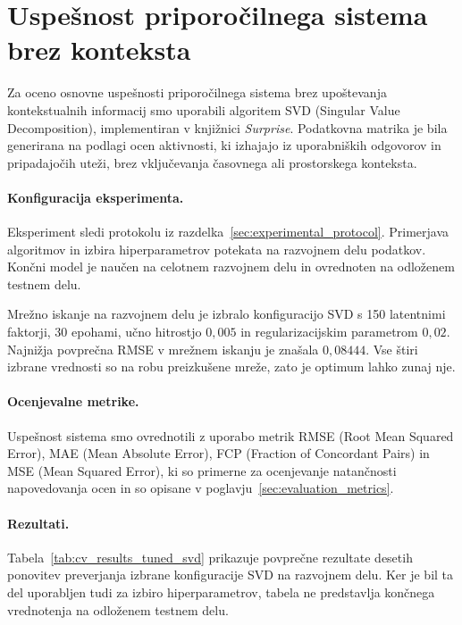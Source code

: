 \documentclass[a4paper,twoside,openright,12pt,slovene]{book}
\begin{document}
\section{Uspešnost priporočilnega sistema brez konteksta} \label{sec:results_without_context}
Za oceno osnovne uspešnosti priporočilnega sistema brez upoštevanja kontekstualnih informacij smo uporabili algoritem SVD (Singular Value Decomposition), implementiran v knjižnici \textit{Surprise}. Podatkovna matrika je bila generirana na podlagi ocen aktivnosti, ki izhajajo iz uporabniških odgovorov in pripadajočih uteži, brez vključevanja časovnega ali prostorskega konteksta.


\paragraph{Konfiguracija eksperimenta.}
Eksperiment sledi protokolu iz
razdelka~\ref{sec:experimental_protocol}. Primerjava algoritmov
in izbira hiperparametrov potekata na razvojnem delu podatkov.
Končni model je naučen na celotnem razvojnem delu in ovrednoten
na odloženem testnem delu.



Mrežno iskanje na razvojnem delu je izbralo konfiguracijo SVD
s 150 latentnimi faktorji, 30 epohami, učno hitrostjo
$0{,}005$ in regularizacijskim parametrom $0{,}02$.
Najnižja povprečna RMSE v mrežnem iskanju je znašala
$0{,}08444$. Vse štiri izbrane vrednosti so na robu preizkušene
mreže, zato je optimum lahko zunaj nje.



\paragraph{Ocenjevalne metrike.} 
Uspešnost sistema smo ovrednotili z uporabo metrik RMSE (Root Mean Squared Error), MAE (Mean Absolute Error), FCP (Fraction of Concordant Pairs) in MSE (Mean Squared Error), ki so primerne za ocenjevanje natančnosti napovedovanja ocen in so opisane v poglavju~\ref{sec:evaluation_metrics}. 



\paragraph{Rezultati.} 
Tabela~\ref{tab:cv_results_tuned_svd} prikazuje povprečne rezultate
desetih ponovitev preverjanja izbrane konfiguracije SVD na
razvojnem delu. Ker je bil ta del uporabljen tudi za izbiro
hiperparametrov, tabela ne predstavlja končnega vrednotenja
na odloženem testnem delu.
\end{document}
